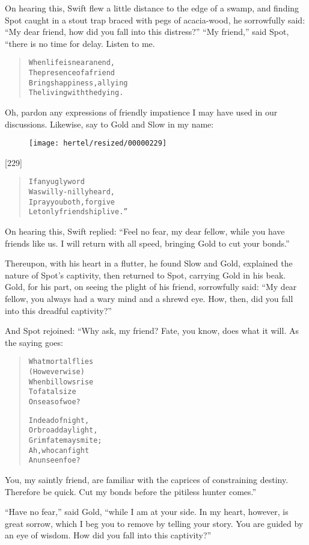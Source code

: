\documentclass[article, twoside, 10pt]{memoir}
\renewenvironment{verbatim}{%
\begin{quote}%
\vskip -10pt%
\begin{alltt}\normalfont\small}{\end{alltt}%
\end{quote}%
\vskip -10pt
} %
\begin{document}
On hearing this, Swift flew a little distance to the edge of a
swamp, and finding Spot caught in a stout trap braced with pegs of
acacia-wood, he sorrowfully said:
``My dear friend, how did you fall into this distress?''
``My friend,'' said Spot, “there is no time for delay. Listen to
me.

\begin{verbatim}
When life is near an end,
The presence of a friend
Brings happiness, allying
The living with the dying.
\end{verbatim}
Oh, pardon any expressions of friendly impatience I may have used
in our discussions. Likewise, say to Gold and Slow in my name:
\begin{figure}[p]\texttt{[image: hertel/resized/00000229]}\end{figure}[229]

\begin{verbatim}
If any ugly word
Was willy-nilly heard,
I pray you both, forgive{\textemdash}
Let only friendship live.”
\end{verbatim}
On hearing this, Swift replied:
``Feel no fear, my dear fellow, while you have friends like us. I will return with all speed, bringing Gold to cut your bonds.''

Thereupon, with his heart in a flutter, he found Slow and Gold,
explained the nature of Spot's captivity, then returned to Spot,
carrying Gold in his beak. Gold, for his part, on seeing the plight
of his friend, sorrowfully said:
``My dear fellow, you always had a wary mind and a shrewd eye. How, then, did you fall into this dreadful captivity?''

And Spot rejoined: “Why ask, my friend? Fate, you know, does what
it will. As the saying goes:

\begin{verbatim}
What mortal flies
(However wise)
When billows rise
To fatal size
    On seas of woe?

In dead of night,
Or broad daylight,
Grim fate may smite;
Ah, who can fight
    An unseen foe?
\end{verbatim}
You, my saintly friend, are familiar with the caprices of
constraining destiny. Therefore be quick. Cut my bonds before the
pitiless hunter comes.”

``Have no fear,'' said Gold,
``while I am at your side. In my heart, however, is great sorrow, which I beg you to remove by telling your story. You are guided by an eye of wisdom. How did you fall into this captivity?''
\end{document}
